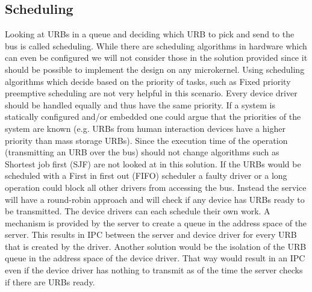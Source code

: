 \documentclass{acm_proc_article-sp}
\begin{document}
\subsection{Scheduling}
Looking at URBs in a queue and deciding which URB to pick and send to the bus is called
scheduling.
While there are scheduling algorithms in hardware which can even be configured \cite{chs-ERSA03}
we will not consider those in the solution provided since it should be possible to implement
the design on any microkernel.
Using scheduling algorithms which decide based on the priority of tasks, such as Fixed priority
preemptive scheduling are not very helpful in this scenario.
Every device driver should be handled equally and thus have the same priority.
If a system is statically configured and/or embedded one could argue that the priorities of
the system are known (e.g. URBs from human interaction devices have a higher priority than
mass storage URBs).
Since the execution time of the operation (transmitting an URB over the bus) should not change
algorithms such as Shortest job first (SJF) are not looked at in this solution.
If the URBs would be scheduled with a First in first out (FIFO) scheduler a faulty driver
or a long operation could block all other drivers from accessing the bus.
Instead the service will have a round-robin approach and will check if any device has URBs
ready to be transmitted.
The device drivers can each schedule their own work.
A mechanism is provided by the server to create a queue in the address space of the server.
This results in IPC between the server and device driver for every URB that is created by
the driver.
Another solution would be the isolation of the URB queue in the address space of the device
driver.
That way would result in an IPC even if the device driver has nothing to transmit as of the
time the server checks if there are URBs ready.


\end{document}

